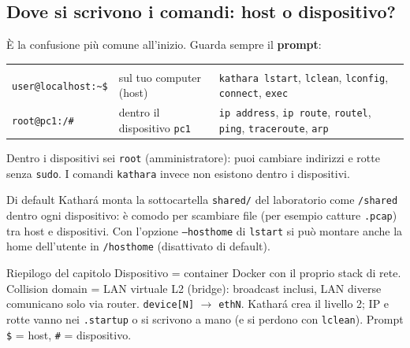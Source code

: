 \subsection{Dove si scrivono i comandi: host o dispositivo?}
È la confusione più comune all'inizio. Guarda sempre il \textbf{prompt}:
\begin{center}
\begin{tabularx}{\linewidth}{l l Y}
 &  & \\
\texttt{user@localhost:\textasciitilde\$} & sul tuo computer (host) & \texttt{kathara lstart}, \texttt{lclean}, \texttt{lconfig}, \texttt{connect}, \texttt{exec}\\
\texttt{root@pc1:/\#} & dentro il dispositivo \texttt{pc1} & \texttt{ip address}, \texttt{ip route}, \texttt{routel}, \texttt{ping}, \texttt{traceroute}, \texttt{arp}\\
\end{tabularx}
\end{center}
Dentro i dispositivi sei \texttt{root} (amministratore): puoi cambiare indirizzi e rotte senza \texttt{sudo}. I comandi \texttt{kathara} invece non esistono dentro i dispositivi.

\begin{mlbox}
Di default Kathará monta la sottocartella \texttt{shared/} del laboratorio come \texttt{/shared} dentro ogni dispositivo: è comodo per scambiare file (per esempio catture \texttt{.pcap}) tra host e dispositivi. Con l'opzione \texttt{--hosthome} di \texttt{lstart} si può montare anche la home dell'utente in \texttt{/hosthome} (disattivato di default).
\end{mlbox}

\begin{appunti}{Riepilogo del capitolo}
Dispositivo = container Docker con il proprio stack di rete. Collision domain = LAN virtuale L2 (bridge): broadcast inclusi, LAN diverse comunicano solo via router. \texttt{device[N]} $\to$ \texttt{ethN}. Kathará crea il livello 2; IP e rotte vanno nei \texttt{.startup} o si scrivono a mano (e si perdono con \texttt{lclean}). Prompt \texttt{\$} = host, \texttt{\#} = dispositivo.
\end{appunti}
